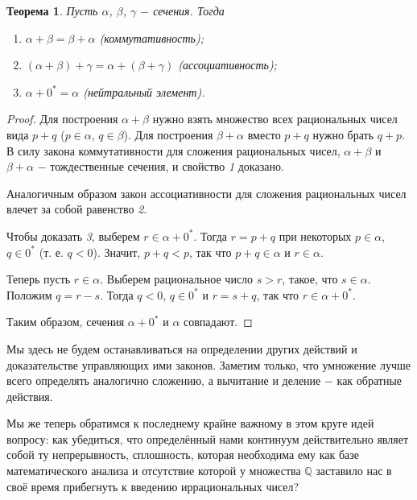\documentclass{article}
\newtheorem{theorem}{Теорема}[section]
\begin{document}
\begin{theorem}
Пусть \(\alpha\), \(\beta\), \(\gamma\) \(-\) сечения. Тогда
\begin{enumerate}
    \item \(\alpha + \beta = \beta + \alpha\) (коммутативность);
    \item \((\alpha + \beta) + \gamma = \alpha + (\beta + \gamma)\) (ассоциативность);
    \item \(\alpha + 0^{*} = \alpha\) (нейтральный элемент).
\end{enumerate}
\end{theorem}

\begin{proof}
Для построения \(\alpha + \beta\) нужно взять множество всех рациональных чисел вида \(p + q\) (\(p \in \alpha\), \(q \in \beta\)). Для построения \(\beta +\alpha\) вместо \(p + q\) нужно брать \(q + p\). В силу закона коммутативности для сложения рациональных чисел, \(\alpha + \beta\) и \(\beta + \alpha\) \(-\) тождественные сечения, и свойство \textit{1} доказано.

Аналогичным образом закон ассоциативности для сложения рациональных чисел влечет за собой равенство \textit{2}.

Чтобы доказать \textit{3}, выберем \(r \in \alpha + 0^{*}\). Тогда \(r = p + q\) при некоторых \(p \in \alpha\), \(q \in 0^{*}\) (т. е. \(q < 0\)). Значит, \(p + q < p\), так что \(p + q \in \alpha\) и \(r \in \alpha\).

Теперь пусть \(r \in \alpha\). Выберем рациональное число \(s > r\), такое,
что \(s \in \alpha\). Положим \(q = r - s\). Тогда \(q < 0\), \(q \in 0^{*}\) и \(r = s + q\), так что \(r \in \alpha + 0^{*}\).

Таким образом, сечения \(\alpha + 0^{*}\) и \(\alpha\) совпадают.
\end{proof}

Мы здесь не будем останавливаться на определении других действий и доказательстве управляющих ими законов. Заметим только, что умножение лучше всего определять аналогично сложению, а вычитание и деление \(-\) как обратные действия.

Мы же теперь обратимся к последнему крайне важному в этом круге идей вопросу: как убедиться, что определённый нами континуум действительно являет собой ту непрерывность, сплошность, которая необходима ему как базе математического анализа и отсутствие которой у множества \(\mathbb{Q}\) заставило нас в своё время прибегнуть к введению иррациональных чисел?
\end{document}
